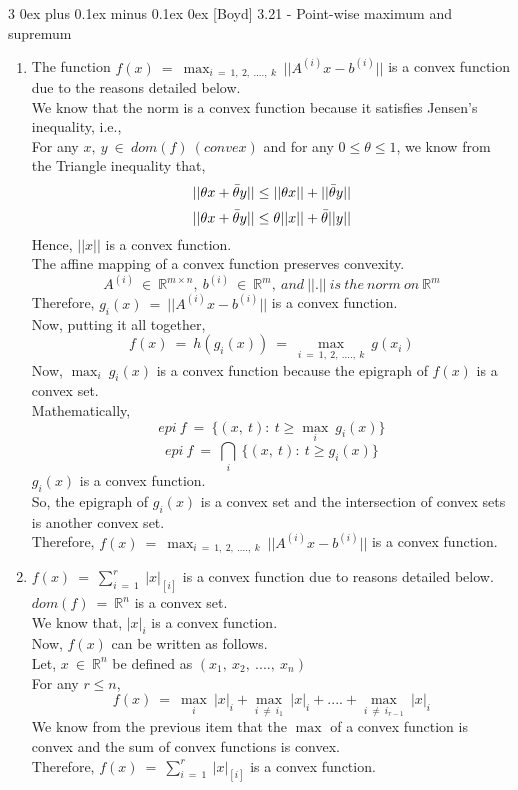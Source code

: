 \documentclass[12pt, draftcls, onecolumn]{IEEEtran}
\makeatletter
\def\subsubsection{\@startsection{subsubsection}%
                                 {3}%
                                 {\z@}%
                                 {0ex plus 0.1ex minus 0.1ex}%
                                 {0ex}%
                                 {\normalfont\normalsize\bfseries}}%
\makeatother
\begin{document}
\subsubsection{[Boyd] 3.21 - Point-wise maximum and supremum}
\begin{enumerate}
    \item The function $f(x)\ =\ \max_{i\ =\ 1,\ 2,\ ....,\ k}\ ||A^{(i)}x-b^{(i)}||$ is a convex function due to the reasons detailed below.
    \\We know that the norm is a convex function because it satisfies Jensen's inequality, i.e.,
    \\For any $x,\ y\ \in\ dom(f)\ (convex)$ and for any $0 \leq \theta \leq 1$, we know from the Triangle inequality that,
    \[||\theta x + \Bar{\theta} y|| \leq ||\theta x|| + ||\Bar{\theta} y||\]
    \[||\theta x + \Bar{\theta} y|| \leq \theta ||x|| + \Bar{\theta} ||y||\]
    Hence, $||x||$ is a convex function.
    \\The affine mapping of a convex function preserves convexity.
    \[A^{(i)}\ \in\ \mathbb{R}^{m \times n},\ b^{(i)}\ \in\ \mathbb{R}^m,\ and\ ||.||\ is\ the\ norm\ on\ \mathbb{R}^m\]
    Therefore, $g_i(x)\ =\ ||A^{(i)}x - b^{(i)}||$ is a convex function.
    \\Now, putting it all together,
    \[f(x)\ =\ h(g_i(x))\ =\ \max_{i\ =\ 1,\ 2,\ ....,\ k}\ g(x_i)\]
    Now, $\max_i\ g_i(x)$ is a convex function because the epigraph of $f(x)$ is a convex set.
    \\Mathematically,
    \[epi\ f\ =\ \{(x,\ t):\ t \geq \max_i\ g_i(x)\}\]
    \[epi\ f\ =\ \bigcap_{i}\ \{(x,\ t):\ t \geq g_i(x)\}\]
    $g_i(x)$ is a convex function. 
    \\So, the epigraph of $g_i(x)$ is a convex set and the intersection of convex sets is another convex set.
    \\Therefore, $f(x)\ =\ \max_{i\ =\ 1,\ 2,\ ....,\ k}\ ||A^{(i)}x-b^{(i)}||$ is a convex function.
    \item $f(x)\ =\ \sum_{i\ =\ 1}^r\ |x|_{[i]}$ is a convex function due to reasons detailed below.
    \\$dom(f)\ =\ \mathbb{R}^n$ is a convex set.
    \\We know that, $|x|_{i}$ is a convex function.
    \\Now, $f(x)$ can be written as follows.
    \\Let, $x\ \in\ \mathbb{R}^n$ be defined as $(x_1,\ x_2,\ ....,\ x_n)$
    \\For any $r \leq n$,
    \[f(x)\ =\ \max_i\ |x|_{i} + \max_{i\ \neq\ i_1}\ |x|_{i} + .... + \max_{i\ \neq\ i_{r-1}}\ |x|_{i}\]
    We know from the previous item that the $\max$ of a convex function is convex and the sum of convex functions is convex.
    \\Therefore, $f(x)\ =\ \sum_{i\ =\ 1}^r\ |x|_{[i]}$ is a convex function.
\end{enumerate}
\end{document}

